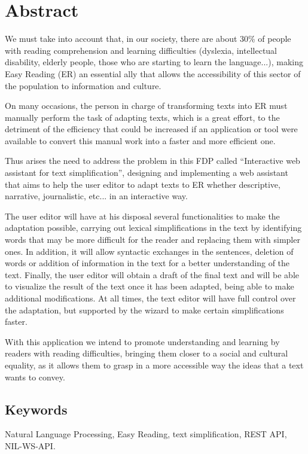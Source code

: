 \chapter*{Abstract}

We must take into account that, in our society, there are about 30\% of people with reading comprehension and learning difficulties (dyslexia, intellectual disability, elderly people, those who are starting to learn the language...), making Easy Reading (ER) an essential ally that allows the accessibility of this sector of the population to information and culture. 

On many occasions, the person in charge of transforming texts into ER must manually perform the task of adapting texts, which is a great effort, to the detriment of the efficiency that could be increased if an application or tool were available to convert this manual work into a faster and more efficient one.

Thus arises the need to address the problem in this FDP called ``Interactive web assistant for text simplification'', designing and implementing a web assistant that aims to help the user editor to adapt texts to ER whether descriptive, narrative, journalistic, etc... in an interactive way. 

The user editor will have at his disposal several functionalities to make the adaptation possible, carrying out lexical simplifications in the text by identifying words that may be more difficult for the reader and replacing them with simpler ones. In addition, it will allow syntactic exchanges in the sentences, deletion of words or addition of information in the text for a better understanding of the text. Finally, the user editor will obtain a draft of the final text and will be able to visualize the result of the text once it has been adapted, being able to make additional modifications. At all times, the text editor will have full control over the adaptation, but supported by the wizard to make certain simplifications faster.

With this application we intend to promote understanding and learning by readers with reading difficulties, bringing them closer to a social and cultural equality, as it allows them to grasp in a more accessible way the ideas that a text wants to convey.


\section*{Keywords}

\noindent Natural Language Processing, Easy Reading, text simplification, REST API, NIL-WS-API.
